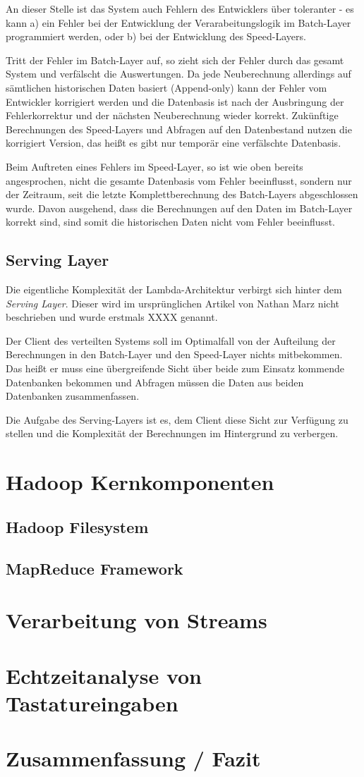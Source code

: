 \documentclass[a4paper,11pt]{scrartcl}
\begin{document}
An dieser Stelle ist das System auch Fehlern des Entwicklers über toleranter -
es kann a) ein Fehler bei der Entwicklung der Verarabeitungslogik im
Batch-Layer programmiert werden, oder b) bei der Entwicklung des Speed-Layers.

Tritt der Fehler im Batch-Layer auf, so zieht sich der Fehler durch das gesamt
System und verfälscht die Auswertungen. Da jede Neuberechnung allerdings auf
sämtlichen historischen Daten basiert (Append-only) kann der Fehler vom
Entwickler korrigiert werden und die Datenbasis ist nach der Ausbringung der
Fehlerkorrektur und der nächsten Neuberechnung wieder korrekt. Zukünftige
Berechnungen des Speed-Layers und Abfragen auf den Datenbestand nutzen die
korrigiert Version, das heißt es gibt nur temporär eine verfälschte Datenbasis.

Beim Auftreten eines Fehlers im Speed-Layer, so ist wie oben bereits
angesprochen, nicht die gesamte Datenbasis vom Fehler beeinflusst, sondern nur
der Zeitraum, seit die letzte Komplettberechnung des Batch-Layers abgeschlossen
wurde. Davon ausgehend, dass die Berechnungen auf den Daten im Batch-Layer
korrekt sind, sind somit die historischen Daten nicht vom Fehler beeinflusst.

\subsection{Serving Layer}
Die eigentliche Komplexität der Lambda-Architektur verbirgt sich hinter dem
\textit{Serving Layer}. Dieser wird im ursprünglichen Artikel von Nathan Marz
nicht beschrieben und wurde erstmals XXXX genannt. 

Der Client des verteilten Systems soll im Optimalfall von der Aufteilung der
Berechnungen in den Batch-Layer und den Speed-Layer nichts mitbekommen. Das
heißt er muss eine übergreifende Sicht über beide zum Einsatz kommende
Datenbanken bekommen und Abfragen müssen die Daten aus beiden Datenbanken
zusammenfassen.

Die Aufgabe des Serving-Layers ist es, dem Client diese Sicht zur Verfügung zu
stellen und die Komplexität der Berechnungen im Hintergrund zu verbergen.

\section{Hadoop Kernkomponenten}
\subsection{Hadoop Filesystem}
\subsection{MapReduce Framework}

\section{Verarbeitung von Streams}

\section{Echtzeitanalyse von Tastatureingaben}

\section{Zusammenfassung / Fazit}
\end{document}
